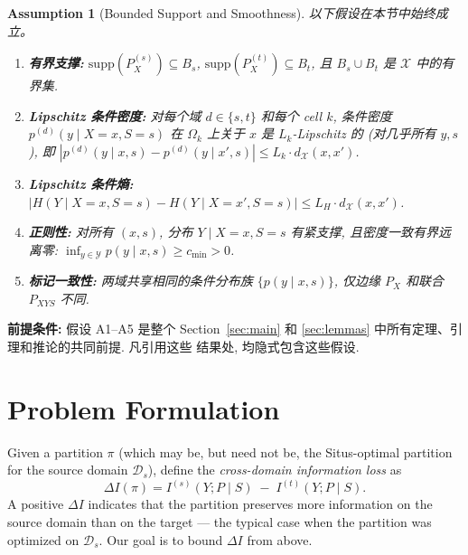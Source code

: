 \documentclass[12pt,a4paper]{article}
\newtheorem{assumption}[theorem]{Assumption}
\newcommand{\cX}{\mathcal{X}}
\newcommand{\cY}{\mathcal{Y}}
\newcommand{\cD}{\mathcal{D}}
\newcommand{\supp}{\mathrm{supp}}
\newcommand{\premise}{\textbf{前提条件: }}
\begin{document}
\begin{assumption}[Bounded Support and Smoothness]
\label{ass:bounded}
以下假设在本节中始终成立。
\begin{enumerate}[label=(A\arabic*)]
    \item \textbf{有界支撑:} $\supp(P_X^{(s)})\subseteq B_s$,
          $\supp(P_X^{(t)})\subseteq B_t$, 且 $B_s\cup B_t$ 是 $\cX$
          中的有界集.
    \item \textbf{Lipschitz 条件密度:} 对每个域 $d\in\{s,t\}$ 和每个
          cell $k$, 条件密度 $p^{(d)}(y\mid X=x,S=s)$ 在 $\Omega_k$
          上关于 $x$ 是 $L_k$-Lipschitz 的 (对几乎所有 $y,s$),
          即 $|p^{(d)}(y\mid x,s)-p^{(d)}(y\mid x',s)|
          \leq L_k\cdot d_{\cX}(x,x')$.
    \item \textbf{Lipschitz 条件熵:}
          $|H(Y\mid X=x,S=s)-H(Y\mid X=x',S=s)|
          \leq L_H\cdot d_{\cX}(x,x')$.
    \item \textbf{正则性:} 对所有 $(x,s)$, 分布 $Y\mid X=x,S=s$
          有紧支撑, 且密度一致有界远离零:
          $\inf_{y\in\cY} p(y\mid x,s)\geq c_{\min}>0$.
    \item \textbf{标记一致性:} 两域共享相同的条件分布族
          $\{p(y\mid x,s)\}$, 仅边缘 $P_X$ 和联合 $P_{XYS}$ 不同.
\end{enumerate}
\end{assumption}

\premise 假设 A1--A5 是整个 Section~\ref{sec:main} 和
\ref{sec:lemmas} 中所有定理、引理和推论的共同前提. 凡引用这些
结果处, 均隐式包含这些假设.

\section{Problem Formulation}
\label{sec:formulation}

Given a partition $\pi$ (which may be, but need not be, the Situs-optimal
partition for the source domain $\cD_s$), define the \emph{cross-domain
information loss} as
\begin{equation}\label{eq:delta-I}
    \Delta I(\pi) = I^{(s)}(Y;P\mid S) \;-\; I^{(t)}(Y;P\mid S).
\end{equation}
A positive $\Delta I$ indicates that the partition preserves more
information on the source domain than on the target — the typical case
when the partition was optimized on $\cD_s$.  Our goal is to bound
$\Delta I$ from above.
\end{document}
